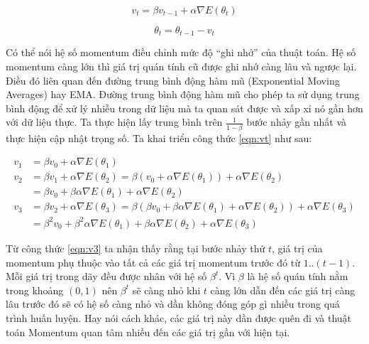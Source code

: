 \begin{equation}
	\label{eqn:vt}
	v_t = \beta v_{t-1} + \alpha \nabla E(\theta_t)
\end{equation}

\begin{equation}
	\label{eqn:theta-momentum}
	\theta_t = \theta_{t-1} - v_t
\end{equation}

Có thể nói hệ số momentum điều chỉnh mức độ ``ghi nhớ'' của thuật toán. Hệ số momentum càng lớn thì giá trị quán tính cũ được ghi nhớ càng lâu và ngược lại. Điều đó liên quan đến đường trung bình động hàm mũ (Exponential Moving Averages) hay EMA. Đường trung bình động hàm mũ cho phép ta sử dụng trung bình động để xử lý nhiễu trong dữ liệu mà ta quan sát được và xấp xỉ nó gần hơn với dữ liệu thực. Ta thực hiện lấy trung bình trên $\frac{1}{1-\beta}$ bước nhảy gần nhất và thực hiện cập nhật trọng số. Ta khai triển công thức \ref{eqn:vt} như sau:

\begin{equation}
	\label{eqn:v3}
	\begin{aligned}
		v_1 &= \beta v_0 + \alpha\nabla E(\theta_1) \\
		v_2 &= \beta v_1 + \alpha \nabla E(\theta_2) = \beta (v_0 + \alpha\nabla E(\theta_1)) + \alpha\nabla E(\theta_2) \\
		&= \beta v_0 + \beta\alpha\nabla E(\theta_1) + \alpha\nabla E(\theta_2) \\
		v_3 &= \beta v_2 + \alpha\nabla E(\theta_3) = \beta (\beta v_0 + \beta\alpha\nabla E(\theta_1) + \alpha\nabla E(\theta_2)) + \alpha\nabla E(\theta_3) \\
		&= \beta^2 v_0 + \beta^2\alpha \nabla E(\theta_1) + \beta \alpha \nabla E(\theta_2) +\alpha \nabla E(\theta_3)
	\end{aligned}
\end{equation}

Từ công thức \ref{eqn:v3} ta nhận thấy rằng tại bước nhảy thứ $t$, giá trị của momentum phụ thuộc vào tất cả các giá trị momentum trước đó từ $1..(t-1)$. Mỗi giá trị trong dãy đều được nhân với hệ số $\beta^t$. Vì $\beta$ là hệ số quán tính nằm trong khoảng $(0,1)$ nên $\beta^t$ sẽ càng nhỏ khi $t$ càng lớn dẫn đến các giá trị càng lâu trước đó sẽ có hệ số càng nhỏ và dần không đóng góp gì nhiều trong quá trình huấn luyện. Hay nói cách khác, các giá trị này dần được quên đi và thuật toán Momentum quan tâm nhiều đến các giá trị gần với hiện tại.

